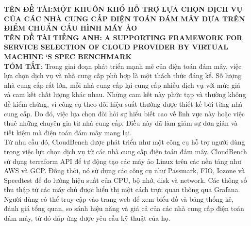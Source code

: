 \documentclass{article}
\begin{document}


\textbf{TÊN ĐỀ TÀI:MỘT KHUÔN KHỔ HỖ TRỢ LỰA CHỌN DỊCH VỤ CỦA CÁC NHÀ CUNG CẤP ĐIỆN TOÁN ĐÁM MÂY DỰA TRÊN ĐIỂM CHUẨN CẤU HÌNH MÁY ẢO} \\

\textbf{TÊN ĐỀ TÀI TIẾNG ANH: A SUPPORTING FRAMEWORK FOR SERVICE SELECTION OF CLOUD PROVIDER BY VIRTUAL MACHINE ‘S SPEC BENCHMARK} \\

\textbf{TÓM TẮT}: Trong giai đoạn phát triển mạnh mẽ của điện toán đám mây, việc lựa chọn dịch vụ và nhà cung cấp phù hợp là một thách thức đáng kể. Số lượng nhà cung cấp rất lớn, mỗi nhà cung cấp lại cung cấp nhiều dịch vụ với mức giá và cam kết chất lượng khác nhau. Những cam kết này phức tạp và thường không dễ kiểm chứng, vì công cụ theo dõi hiệu suất thường được thiết kế bởi từng nhà cung cấp. Do đó, việc lựa chọn đòi hỏi sự hiểu biết cao về lĩnh vực này hoặc việc thuê những chuyên gia từ nhà cung cấp. Điều này đã làm giảm sự đơn giản và tiết kiệm mà điện toán đám mây mang lại. \\

Từ nhu cầu đó, CloudBench được phát triển như một công cụ hỗ trợ người dùng trong việc lựa chọn dịch vụ từ các nhà cung cấp điện toán đám mây. CloudBench sử dụng terraform API để tự động tạo các máy ảo Linux trên các nền tảng như AWS và GCP. Đồng thời, nó sử dụng các công cụ như Passmark, FIO, Iozone và Speedtest để đo lường hiệu suất của CPU, bộ nhớ, disk và network. Các thông số thu thập từ các máy chủ được hiển thị một cách trực quan thông qua Grafana. Người dùng có thể truy cập vào trang web để xem biểu đồ và bảng thống kê, đánh giá tổng quan, so sánh hiệu năng và giá cả của các nhà cung cấp điện toán đám mây, từ đó đáp ứng được yêu cầu kỹ thuật của họ. \\
\end{document}
